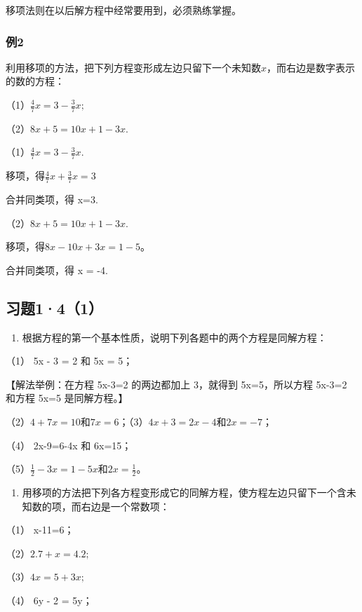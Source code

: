 移项法则在以后解方程中经常要用到，必须熟练掌握。

\subsubsection{例2}

利用移项的方法，把下列方程变形成左边只留下一个未知数\(x\)，而右边是数字表示的数的方程：

（1）\(\frac{4}{7} x = 3 - \frac{3}{7} x;\)

（2）\(8x + 5 = 10x + 1 - 3x.\)

 （1）\(\frac{4}{7} x = 3 - \frac{3}{7} x.\)

移项，得\(\frac{4}{7}x + \frac{3}{7}x = 3\)

合并同类项，得 x=3.

（2）\(8x + 5 = 10x + 1 - 3x.\)

移项，得\(8x - 10x + 3x = 1 - 5\)。

合并同类项，得 x = -4.

\subsection{习题1·4（1）}

\begin{enumerate}
\item
  根据方程的第一个基本性质，说明下列各题中的两个方程是同解方程：
\end{enumerate}

（1） 5x - 3 = 2 和 5x = 5；

【解法举例：在方程 5x-3=2 的两边都加上 3，就得到 5x=5，所以方程 5x-3=2
和方程 5x=5 是同解方程。】

（2）\(4 + 7x = 10\)和\(7x = 6\)；（3）\(4x + 3 = 2x - 4\)和\(2x = -7\)；

（4） 2x-9=6-4x 和 6x=15；

（5）\(\frac{1}{2} - 3x = 1 - 5x\)和\(2x = \frac{1}{2}\)。

\begin{enumerate}[start=2]
\item
  用移项的方法把下列各方程变形成它的同解方程，使方程左边只留下一个含未知数的项，而右边是一个常数项：
\end{enumerate}

（1） x-11=6；

（2）\(2.7 + x = 4.2;\)

（3）\(4x=5+3x;\)

（4） 6y - 2 = 5y；

